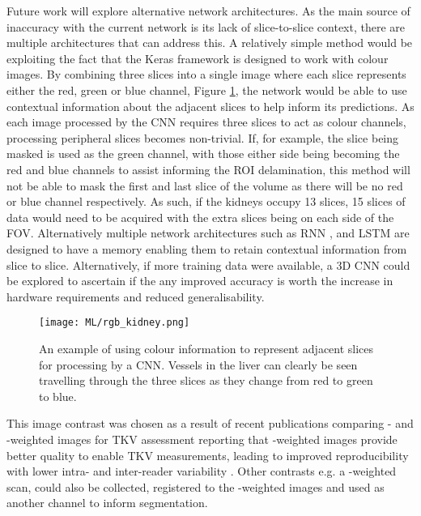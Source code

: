 Future work will explore alternative network architectures. As the main source of inaccuracy with the current network is its lack of slice-to-slice context, there are multiple architectures that can address this. A relatively simple method would be exploiting the fact that the Keras framework is designed to work with colour images. By combining three slices into a single image where each slice represents either the red, green or blue channel, Figure \ref{fig:ml_rgb_slices}, the network would be able to use contextual information about the adjacent slices to help inform its predictions. As each image processed by the \ac{CNN} requires three slices to act as colour channels, processing peripheral slices becomes non-trivial. If, for example, the slice being masked is used as the green channel, with those either side being becoming the red and blue channels to assist informing the \ac{ROI} delamination, this method will not be able to mask the first and last slice of the volume as there will be no red or blue channel respectively. As such, if the kidneys occupy 13 slices, 15 slices of data would need to be acquired with the extra slices being on each side of the \ac{FOV}. Alternatively multiple network architectures such as \ac{RNN} \cite{chen_combining_2016}, and \ac{LSTM} \cite{stollenga_parallel_2015} are designed to have a memory enabling them to retain contextual information from slice to slice. Alternatively, if more training data were available, a 3D \ac{CNN} could be explored to ascertain if the any improved accuracy is worth the increase in hardware requirements and reduced generalisability.
 
\begin{figure}[H]
	\centering
	\texttt{[image: ML/rgb\_kidney.png]}
	\caption{An example of using colour information to represent adjacent slices for processing by a \ac{CNN}. Vessels in the liver can clearly be seen travelling through the three slices as they change from red to green to blue.}
	\label{fig:ml_rgb_slices}	
\end{figure}

This image contrast was chosen as a result of recent publications comparing \tone- and \ttwo-weighted images for \ac{TKV} assessment reporting that \ttwo-weighted images provide better quality to enable \ac{TKV} measurements, leading to improved reproducibility with lower intra- and inter-reader variability \cite{van_gastel_t1_2018}. Other contrasts e.g. a \tone-weighted scan, could also be collected, registered to the \ttwo-weighted images and used as another channel to inform segmentation.

